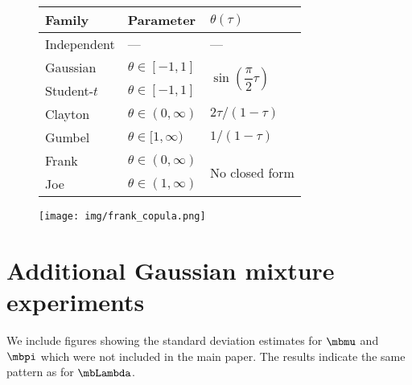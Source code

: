 \begin{figure}[!h]
\begin{minipage}{\textwidth}
  \begin{minipage}[b]{0.49\textwidth}
    \centering
  \begin{tabular}{|l|l|l|}
  \hline
  \textbf{Family} & \textbf{Parameter} &  $\theta(\tau)$\\
  \hline
  Independent & --- & --- \\ \hline
  Gaussian               & $\theta \in [-1,1]$       &
  \multirow{2}{*}{$\sin\left(\dfrac{\pi}{2} \tau\right)$} \\\cline{1-2}
  Student-$t$            & $\theta \in [-1,1]$       & \\ \hline
  Clayton                & $\theta \in (0, \infty) $ & $2\tau/(1-\tau)$ \\ \hline
  Gumbel                 & $\theta \in [1,\infty)$   & $1/(1-\tau)$ \\ \hline
  Frank                  & $\theta \in (0, \infty)$  & \multirow{2}{*}{No closed form} \\\cline{1-2}
  Joe                    & $\theta \in (1, \infty)$  &\\\hline
  \end{tabular}
    \end{minipage}
  \hfill
  \begin{minipage}[b]{0.49\textwidth}
    \centering
    \texttt{[image: img/frank\_copula.png]}
  \end{minipage}
\end{minipage}
\end{figure}

\section{Additional Gaussian mixture experiments}

We include figures showing the standard deviation estimates for $\mbmu$ and $\mbpi$ which were not included in the main paper. The results indicate the same pattern as for $\mbLambda$.

